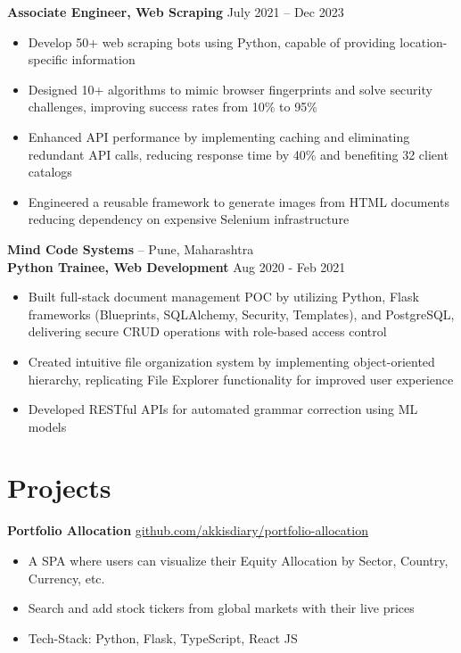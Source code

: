 \documentclass[11pt]{article}       %
\begin{document}
\vspace{-5pt}
\textbf{Associate Engineer, Web Scraping} \hfill July 2021 -- Dec 2023 \\
\vspace{-9pt}
\begin{itemize}
  \item Develop 50+ web scraping bots using Python, capable of providing location-specific information \\ 
  \item Designed 10+ algorithms to mimic browser fingerprints and solve security challenges, improving success rates from 10\% to 95\% \\
  \item Enhanced API performance by implementing caching and eliminating redundant API calls, reducing response time by 40\% and benefiting 32 client catalogs \\
  \item Engineered a reusable framework to generate images from HTML documents reducing dependency on expensive Selenium infrastructure \\
\end{itemize}

\textbf {Mind Code Systems} -- Pune, Maharashtra \\
\textbf{Python Trainee, Web Development} \hfill Aug 2020 - Feb 2021 \\
\vspace{-9pt}
\begin{itemize}
  \item Built full-stack document management POC by utilizing Python, Flask frameworks (Blueprints, SQLAlchemy, Security, Templates), and PostgreSQL, delivering secure CRUD operations with role-based access control
  \item Created intuitive file organization system by implementing object-oriented hierarchy, replicating File Explorer functionality for improved user experience
  \item Developed RESTful APIs for automated grammar correction using ML models
\end{itemize}

\vspace{-18.5pt}

\section*{Projects}
\textbf{Portfolio Allocation} \hfill \href{https://github.com/Akkisdiary/portfolio-allocation}{github.com/akkisdiary/portfolio-allocation} \\
\vspace{-9pt}
\begin{itemize}
  \item A SPA where users can visualize their Equity Allocation by Sector, Country, Currency, etc.
  \item Search and add stock tickers from global markets with their live prices
  \item Tech-Stack: Python, Flask, TypeScript, React JS
\end{itemize}
\end{document}
